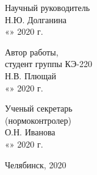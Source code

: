 \begin{titlepage}
    \hfill
    \begin{minipage}{0.4\textwidth}
        Научный руководитель\\
        \underline{\hspace{2cm}} Н.Ю. Долганина\\
        «\underline{\hspace{0.7cm}}» \underline{\hspace{2cm}} 2020 г.
    \end{minipage}
    \bigskip
    \vfill

    \hfill
    \begin{minipage}{0.4\textwidth}
        Автор работы,\\
        студент группы КЭ-220\\
        \underline{\hspace{2cm}} Н.В. Плющай\\
        «\underline{\hspace{0.7cm}}» \underline{\hspace{2cm}} 2020 г.
    \end{minipage}
    \bigskip
    \vfill

    \hfill
    \begin{minipage}{0.4\textwidth}
        Ученый секретарь\\
        (нормоконтролер)\\
        \underline{\hspace{2cm}} О.Н. Иванова\\
        «\underline{\hspace{0.7cm}}» \underline{\hspace{2cm}} 2020 г.
    \end{minipage}
    \bigskip
    \vfill

    \begin{center}
        Челябинск, 2020
    \end{center}
\end{titlepage}
